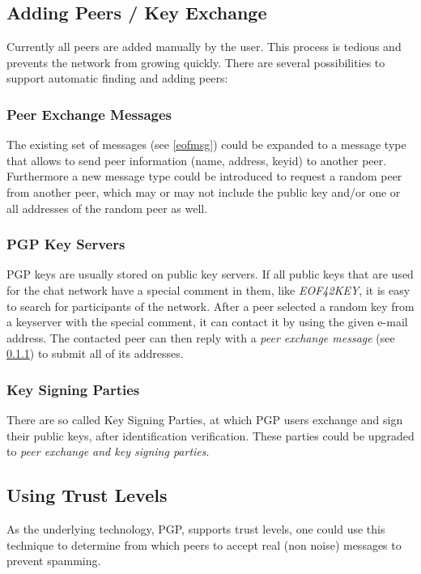 \subsection{Adding Peers / Key Exchange}
\label{keyexchange}
Currently all peers are added manually by the user. 
This process is tedious and prevents the network from growing quickly.
There are several possibilities to support automatic finding and
adding peers:
\subsubsection{Peer Exchange Messages}
\label{peerexchange}
The existing set of messages (see \ref{eofmsg}) could be expanded to a message
type that allows to send peer information (name, address, keyid) to another
peer. Furthermore a new message type could be introduced to request a random
peer from another peer, which may or may not include the public key 
and/or one or all addresses of the random peer as well.
\subsubsection{PGP Key Servers}
PGP keys are usually stored on public key servers.
If all public keys that are used for the chat network have a special comment
in them, like \textit{EOF42KEY}, it is easy to search for participants of the
network. After a peer selected a random key from a keyserver with the
special comment, it can contact it by using the given e-mail address.
The contacted peer can then reply with a \textit{peer exchange message}
(see \ref{peerexchange}) to submit all of its addresses.
\subsubsection{Key Signing Parties}
There are so called Key Signing Parties, at which PGP users exchange and
sign their public keys, after identification verification.
These parties could be upgraded to \textit{peer exchange and key signing
parties}.
\subsection{Using Trust Levels}
As the underlying technology, PGP, supports trust levels, one could use this
technique to determine from which peers to accept real (non noise)
messages to prevent spamming.
